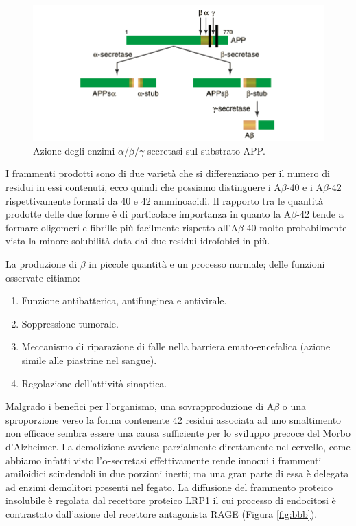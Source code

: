 \documentclass[a4paper, 12pt]{article}
\begin{document}
\begin{figure}[H]
	\includegraphics[width=\linewidth]{immagini/APP.png}
	\caption{Azione degli enzimi \(\alpha\)/\(\beta\)/\(\gamma\)-secretasi sul substrato APP.}
	\label{fig:app}
\end{figure}


I frammenti prodotti sono di due varietà che si differenziano per il numero di residui in essi contenuti, ecco quindi che possiamo distinguere i A\(\beta\)-40 e i A\(\beta\)-42 rispettivamente formati da 40 e 42 amminoacidi. Il rapporto tra le quantità prodotte delle due forme è di particolare importanza in quanto la A\(\beta\)-42 tende a formare oligomeri e fibrille più facilmente rispetto all’A\(\beta\)-40 molto probabilmente vista la minore solubilità data dai due residui idrofobici in più.\autocite{kepp_bioinorganic_2012, irvine_protein_2008}

La produzione di \(\beta\) in piccole quantità e un processo normale; delle funzioni osservate citiamo: \autocite{brothers_physiological_2018}

\begin{enumerate}
	\item Funzione antibatterica, antifunginea e antivirale.
	\item Soppressione tumorale.
	\item Meccanismo di riparazione di falle nella barriera emato-encefalica (azione simile alle piastrine nel sangue).
	\item Regolazione dell'attività sinaptica.
\end{enumerate}

Malgrado i benefici per l'organismo, una sovrapproduzione di A\(\beta\) o una sproporzione verso la forma contenente 42 residui associata ad uno smaltimento non efficace sembra essere una causa sufficiente per lo sviluppo precoce del Morbo d’Alzheimer. \autocite{irvine_protein_2008}
La demolizione avviene parzialmente direttamente nel cervello, come abbiamo infatti visto l'\(\alpha\)-secretasi effettivamente rende innocui i frammenti amiloidici scindendoli in due porzioni inerti; ma una gran parte di essa è delegata ad enzimi demolitori presenti nel fegato. La diffusione del frammento proteico insolubile è regolata dal recettore proteico LRP1 il cui processo di endocitosi è contrastato dall'azione del recettore antagonista RAGE (Figura \ref{fig:bbb}).\autocite{lillis_beyond_2005, dries_extracting_2012}
\end{document}
